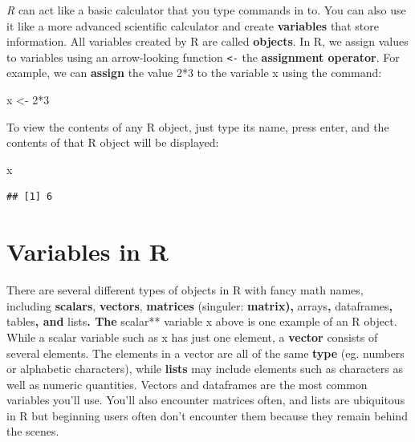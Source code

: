 \documentclass[
]{book}
\newenvironment{Shaded}{\begin{snugshade}}{\end{snugshade}}
\newcommand{\DecValTok}[1]{\textcolor[rgb]{0.00,0.00,0.81}{#1}}
\newcommand{\NormalTok}[1]{#1}
\newcommand{\OtherTok}[1]{\textcolor[rgb]{0.56,0.35,0.01}{#1}}
\newcommand{\SpecialCharTok}[1]{\textcolor[rgb]{0.00,0.00,0.00}{#1}}
\begin{document}
\emph{R} can act like a basic calculator that you type commands in to. You can also use it like a more advanced scientific calculator and create \textbf{variables} that store information. All variables created by R are called \textbf{objects}. In R, we assign values to variables using an arrow-looking function \texttt{\textless{}-} the \textbf{assignment operator}. For example, we can \textbf{assign} the value 2*3 to the variable x using the command:

\begin{Shaded}
\begin{Highlighting}[]
\NormalTok{x }\OtherTok{\textless{}{-}} \DecValTok{2}\SpecialCharTok{*}\DecValTok{3}
\end{Highlighting}
\end{Shaded}

To view the contents of any R object, just type its name, press enter, and the contents of that R object will be displayed:

\begin{Shaded}
\begin{Highlighting}[]
\NormalTok{x}
\end{Highlighting}
\end{Shaded}

\begin{verbatim}
## [1] 6
\end{verbatim}

\hypertarget{variables-in-r}{%
\section{Variables in R}\label{variables-in-r}}

There are several different types of objects in R with fancy math names, including \textbf{scalars}, \textbf{vectors}, \textbf{matrices} (singuler: \textbf{matrix), }arrays\textbf{, }dataframes\textbf{, }tables\textbf{, and }lists\textbf{. The }scalar** variable x above is one example of an R object. While a scalar variable such as x has just one element, a \textbf{vector} consists of several elements. The elements in a vector are all of the same \textbf{type} (eg. numbers or alphabetic characters), while \textbf{lists} may include elements such as characters as well as numeric quantities. Vectors and dataframes are the most common variables you'll use. You'll also encounter matrices often, and lists are ubiquitous in R but beginning users often don't encounter them because they remain behind the scenes.
\end{document}
